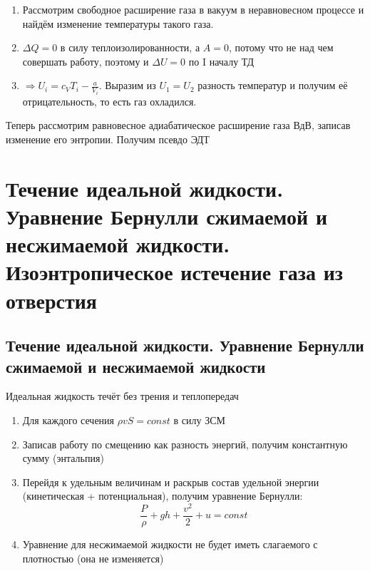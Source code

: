 \documentclass[a4paper, 14pt]{article}
\begin{document}
    \begin{enumerate}
        \item Рассмотрим свободное расширение газа в вакуум в неравновесном процессе и найдём изменение температуры
        такого газа.
        \item $\Delta Q = 0$ в силу теплоизолированности, а $A = 0$, потому что не над чем совершать работу, поэтому
        и $\Delta U = 0$ по I началу ТД
        \item $\Rightarrow U_i = c_V T_i - \frac{a}{V_i}$.
        Выразим из $U_1 = U_2$ разность температур и получим её отрицательность, то есть газ охладился.
    \end{enumerate}
    
    Теперь рассмотрим равновесное адиабатическое расширение газа ВдВ, записав изменение его энтропии.
    Получим псевдо ЭДТ
    
    \section{Течение идеальной жидкости.
    Уравнение Бернулли сжимаемой и несжимаемой жидкости.
    Изоэнтропическое истечение газа из отверстия}
    
    \subsection{Течение идеальной жидкости. Уравнение Бернулли сжимаемой и несжимаемой жидкости}
    
    Идеальная жидкость течёт без трения и теплопередач
    
    \begin{enumerate}
        \item Для каждого сечения $\rho vS = const$ в силу ЗСМ
        \item Записав работу по смещению как разность энергий, получим константную сумму (энтальпия)
        \item Перейдя к удельным величинам и раскрыв состав удельной энергии (кинетическая + потенциальная), получим
        уравнение Бернулли:
        \[ \frac{P}{\rho} + gh + \frac{v^2}{2} + u = const \]
        \item Уравнение для несжимаемой жидкости не будет иметь слагаемого с плотностью (она не изменяется)
    \end{enumerate}
    
\end{document}
